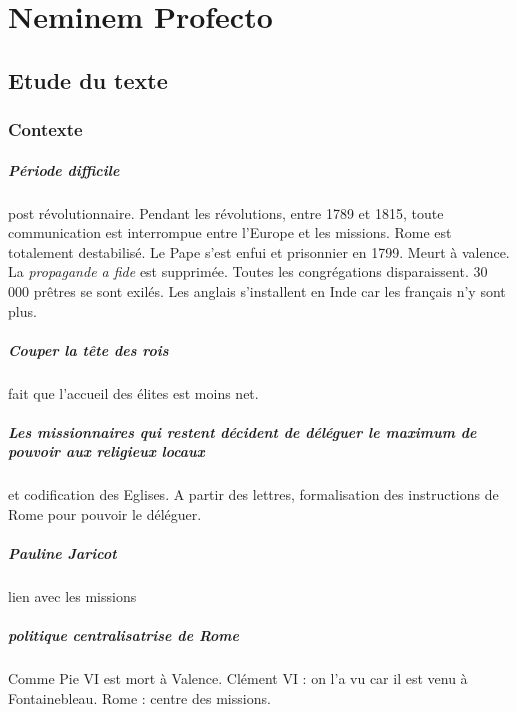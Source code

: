 \chapter{Neminem Profecto}



\section{Etude du texte}

\subsection{Contexte}
\paragraph{Période difficile} post révolutionnaire. Pendant les révolutions, entre 1789 et 1815, toute communication est interrompue entre l'Europe et les missions. Rome est totalement destabilisé. Le Pape s'est enfui et prisonnier en 1799. Meurt à valence. La \textit{propagande a fide} est supprimée. Toutes les congrégations disparaissent. 30 000 prêtres se sont exilés. Les anglais s'installent en Inde car les français n'y sont plus. 
\paragraph{Couper la tête des rois} fait que l'accueil des élites est moins net.

\paragraph{Les missionnaires qui restent décident de déléguer le maximum de pouvoir aux religieux locaux} et codification des Eglises. A partir des lettres, formalisation des instructions de Rome pour pouvoir le déléguer.



 
\paragraph{Pauline Jaricot} lien avec les missions

\paragraph{politique centralisatrise de Rome} Comme Pie VI est mort à Valence. Clément VI : on l'a vu car il est venu à Fontainebleau. Rome : centre des missions.

